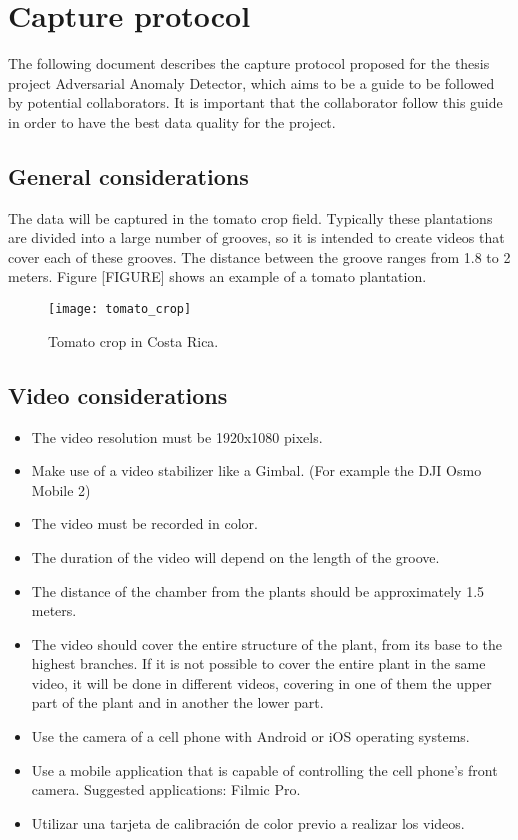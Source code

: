 \chapter{Capture protocol}
\label{ch:appendix}

The following document describes the capture protocol proposed for the thesis project Adversarial Anomaly Detector, which aims to be a guide to be followed by potential collaborators. It is important that the collaborator follow this guide in order to have the best data quality for the project.

\section{General considerations}

The data will be captured in the tomato crop field. Typically these plantations are divided into a large number of grooves, so it is intended to create videos that cover each of these grooves. The distance between the groove ranges from 1.8 to 2 meters. Figure [FIGURE] shows an example of a tomato plantation.

\begin{figure}[htb]
  \centering
  \texttt{[image: tomato\_crop]}
  \caption[Tomato crop]{Tomato crop in Costa Rica.}
  \label{fig:tomato_crop}
\end{figure}

\section{Video considerations}

\begin{itemize}
 \item The video resolution must be 1920x1080 pixels.
 \item Make use of a video stabilizer like a Gimbal. (For example the DJI Osmo Mobile 2)
 \item The video must be recorded in color.
 \item The duration of the video will depend on the length of the groove.
 \item The distance of the chamber from the plants should be approximately 1.5 meters.
 \item The video should cover the entire structure of the plant, from its base to the highest branches. If it is not possible to cover the entire plant in the same video, it will be done in different videos, covering in one of them the upper part of the plant and in another the lower part.
 \item Use the camera of a cell phone with Android or iOS operating systems.
 \item Use a mobile application that is capable of controlling the cell phone's front camera. Suggested applications: Filmic Pro.
 \item Utilizar una tarjeta de calibración de color previo a realizar los videos.
\end{itemize}

